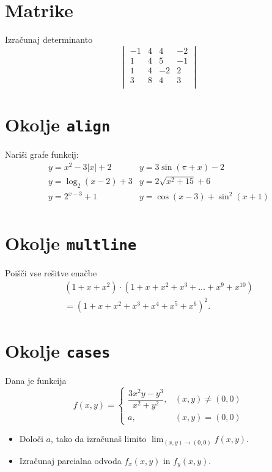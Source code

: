 \documentclass[a4paper,12pt]{article}
\begin{document}
\section*{Matrike}
Izračunaj determinanto
\[
\begin{vmatrix}
 -1 & 4 & 4 & -2 \\
  1 & 4 & 5 & -1 \\
  1 & 4 & -2 & 2 \\
  3 & 8 & 4 & 3 \\
\end{vmatrix} 
\]
  

\section*{Okolje \texttt{align}}
Nariši grafe funkcij:
\begin{align*}
y = x^2 - 3|x| + 2  &  y = 3 \sin(\pi+x) - 2 \\
y = \log_2(x-2) + 3  &  y = 2 \sqrt{x^2+15} + 6 \\
y = 2^{x-3} + 1       &  y = \cos(x-3) + \sin^2(x+1) \\
\end{align*}


\section*{Okolje \texttt{multline}}
Poišči vse rešitve enačbe
\begin{multline*}
  (1+x+x^2) \cdot (1+x+x^2+x^3+\ldots+x^9+x^{10}) \\
  = (1+x+x^2+x^3+x^4+x^5+x^6)^2.
\end{multline*}


\section*{Okolje \texttt{cases}}
Dana je funkcija
\[
f(x,y) = \begin{cases}
\dfrac{3x^2y-y^3}{x^2+y^2}, & (x,y)\neq(0,0) \\
a, & (x,y)=(0,0)
\end{cases}
\]
\begin{itemize}
\item Določi \(a\), tako da izračunaš limito \( \lim_{(x,y)\to(0,0)} f(x,y) \).
\item Izračunaj parcialna odvoda \(f_x(x,y)\) in \(f_y(x,y)\).
\end{itemize}
\end{document}
